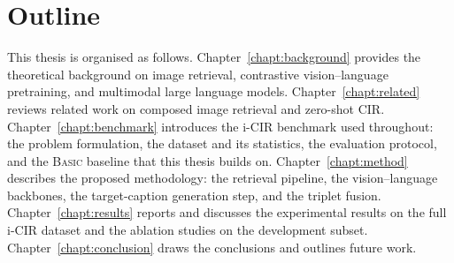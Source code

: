 
\section{Outline}\label{sect:intro_outline}

This thesis is organised as follows.
Chapter~\ref{chapt:background} provides the theoretical background on image
retrieval, contrastive vision--language pretraining, and multimodal large
language models.
Chapter~\ref{chapt:related} reviews related work on composed image retrieval and
zero-shot CIR.
Chapter~\ref{chapt:benchmark} introduces the i-CIR benchmark used throughout: the
problem formulation, the dataset and its statistics, the evaluation protocol, and
the \textsc{Basic} baseline that this thesis builds on.
Chapter~\ref{chapt:method} describes the proposed methodology: the retrieval
pipeline, the vision--language backbones, the target-caption generation step, and
the triplet fusion.
Chapter~\ref{chapt:results} reports and discusses the experimental results on
the full i-CIR dataset and the ablation studies on the development subset.
Chapter~\ref{chapt:conclusion} draws the conclusions and outlines future work.
